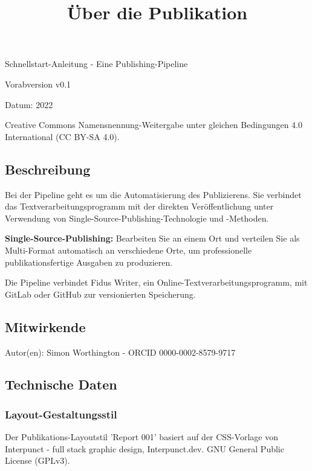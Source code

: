 \documentclass{article}
\begin{document}
\title{Über die Publikation}

\maketitle


Schnellstart-Anleitung - Eine Publishing-Pipeline


Vorabversion v0.1


Datum: 2022


Creative Commons Namensnennung-Weitergabe unter gleichen Bedingungen 4.0 International (CC BY-SA 4.0).


\subsection{Beschreibung}\label{H779765}



Bei der Pipeline geht es um die Automatisierung des Publizierens. Sie verbindet das Textverarbeitungsprogramm mit der direkten Veröffentlichung unter Verwendung von Single-Source-Publishing-Technologie und -Methoden.


\textbf{Single-Source-Publishing:} Bearbeiten Sie an einem Ort und verteilen Sie als Multi-Format automatisch an verschiedene Orte, um professionelle publikationsfertige Ausgaben zu produzieren.


Die Pipeline verbindet Fidus Writer, ein Online-Textverarbeitungsprogramm, mit GitLab oder GitHub zur versionierten Speicherung.


\subsection{Mitwirkende}\label{H8655734}



Autor(en): Simon Worthington - ORCID 0000-0002-8579-9717


\subsection{Technische Daten}\label{H3247814}



\subsubsection{Layout-Gestaltungsstil}\label{H8853078}



Der Publikations-Layoutstil 'Report 001' basiert auf der CSS-Vorlage von Interpunct - full stack graphic design, Interpunct.dev. GNU General Public License (GPLv3).
\end{document}
